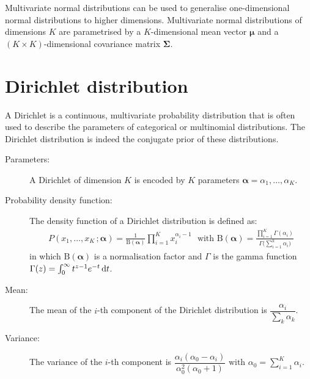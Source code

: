 Multivariate normal distributions can be used to generalise one-dimensional normal distributions to higher dimensions. Multivariate normal distributions of dimensions $K$ are parametrised by a $K$-dimensional mean vector $\boldsymbol\mu$ and a $(K \times K)$-dimensional covariance matrix $\boldsymbol\Sigma$. 

\section*{Dirichlet distribution}

A Dirichlet is a continuous, multivariate probability distribution that is often used to describe the parameters of categorical or multinomial distributions.  The Dirichlet distribution is indeed the conjugate prior of these distributions. 

\begin{description}
\item [Parameters: ] A Dirichlet of dimension $K$ is encoded by $K$ parameters $\boldsymbol\alpha = \alpha_1, \dots, \alpha_K$. 

\item [Probability density function: ] The density function of a Dirichlet distribution is defined as:
\begin{align}
P(x_1, \dots, x_K\,; \boldsymbol\alpha) = \frac{1}{\mathrm{B}(\boldsymbol\alpha)} \prod_{i=1}^K x_i^{\alpha_i - 1} \ \ \ \text{with } \mathrm{B}(\boldsymbol\alpha) = \frac{\prod_{i=1}^K \Gamma(\alpha_i)}{\Gamma\bigl(\sum_{i=1}^k \alpha_i\bigr)}
\end{align}
in which $ \mathrm{B}(\boldsymbol\alpha)$ is a normalisation factor and $\Gamma$ is the gamma function $\Gamma(z) = \int_0^\infty  t^{z-1} e^{-t}\,{\rm d}t$. 

\item [Mean: ] The mean of the $i$-th component of the Dirichlet distribution is $\dfrac{\alpha_i}{\sum_k \alpha_k}$.

\item [Variance: ] The variance of the $i$-th component is $\dfrac{\alpha_i (\alpha_0-\alpha_i)}{\alpha_0^2 (\alpha_0+1)} \text{ with } \alpha_0 = \sum_{i=1}^K\alpha_i$.

\end{description}

